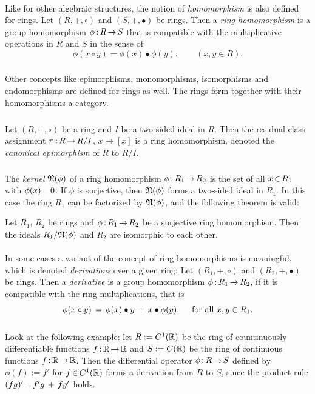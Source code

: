 \documentclass[11pt,twoside]{article}
\begin{document}
\paragraph{}
Like for other algebraic structures,
the notion of \textit{homomorphism} is also defined for rings.
Let $(R,+,\circ)$ and $(S,+,\bullet)$ be rings.
Then a \textit{ring homomorphism} is a group homomorphism $\phi {\,:\,}R {\,\to\,} S$
that is compatible with the multiplicative operations in $R$ and $S$
in the sense of
\[
\phi(x \circ y) = \phi(x) \bullet \phi(y), \qquad (x,y \in R).
\]

\subparagraph{}
Other concepts like
epimorphisms,
monomorphisms,
isomorphisms and
endomorphisms are defined for rings as well.
The rings form together with their homomorphisms a category.

\subparagraph{}
Let $(R,+,\circ)$ be a ring and $I$ be a two-sided ideal in $R$.
Then the residual class assignment $\pi {\,:\,} R {\,\to\,} R/I$, $x \mapsto [x]$
is a ring homomorphism,
denoted the \textit{canonical epimorphism} of $R$ to $R/I$.

\subparagraph{}
The \textit{kernel} $\mathfrak{N}(\phi)$ of a ring homomorphism $\phi {\,:\,} R_1 {\,\to\,} R_2$
is the set of all $x {\,\in\,} R_1$ with $\phi(x) {\,=\,} 0$.
If $\phi$ is surjective,
then $\mathfrak{N}(\phi)$ forms a two-sided ideal in $R_1$.
In this case the ring $R_1$ can be factorized by $\mathfrak{N}(\phi)$,
and the following theorem is valid:

\begin{theorem}
Let $R_1$, $R_2$ be rings and $\phi{\,:\,}R_1 {\,\to\,} R_2$ be a surjective
ring homomorphism.
Then the ideals $R_1 / \mathfrak{N}(\phi)$ and $R_2$ are isomorphic to each other.
\end{theorem}

\paragraph{}
In some cases a variant of the concept of ring homomorphisms is meaningful,
which is denoted \textit{derivations} over a given ring:
Let $(R_1,+,\circ)$ and $(R_2,+,\bullet)$ be rings.
Then a \textit{derivative} is a group homomorphism $\phi {\,:\,} R_1 {\,\to\,} R_2$,
if it is compatible with the ring multiplications,
that is
\[
\phi(x \circ y) \,=\, \phi(x) \bullet y \, + \, x \bullet \phi(y),
\quad \mbox{ for all } x,y \in R_1.
\]

\subparagraph{}
Look at the following example:
let $R := C^1({\mathbb{R}})$ be the ring of countinuously differentiable functions
$f {\,:\,} {\mathbb{R}} {\,\to\,} {\mathbb{R}}$
and $S := C({\mathbb{R}})$ be the ring of continuous functions $f {\,:\,} {\mathbb{R}} {\,\to\,} {\mathbb{R}}$.
Then the differential operator $\phi {\,:\,} R {\,\to\,} S$ 
defined by $\phi(f) := f'$ for $f {\,\in\,} C^1({\mathbb{R}})$ forms a derivation
from $R$ to $S$,
since the product rule $(fg)' {\,=\,} f'g \,+\, fg'$ holds.
\end{document}
